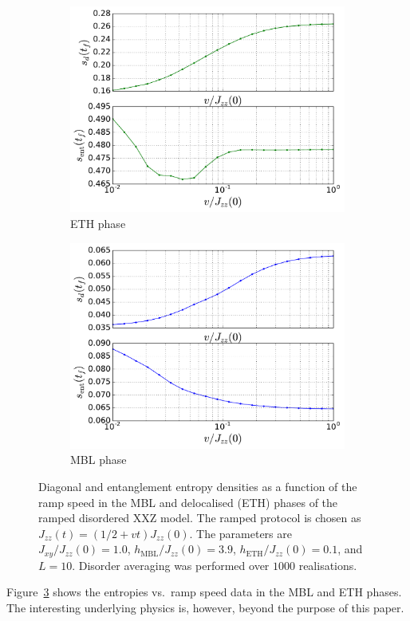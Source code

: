 \documentclass{SciPost}
\newcommand\0{\scalebox{-1}[1]{0}}
\begin{document}
\begin{figure}[t!]
	\centering
	\begin{subfigure}[b]{0.496\textwidth}
		\includegraphics[width=\textwidth]{example1_ETH}
		\caption{ETH phase}
		\label{fig:gull}
	\end{subfigure}
	\begin{subfigure}[b]{0.496\textwidth}
		\includegraphics[width=\textwidth]{example1_MBL}
		\caption{MBL phase}
		\label{fig:tiger}
	\end{subfigure}
	\caption{\label{fig:example1} Diagonal and entanglement entropy densities as a function of the ramp speed in the MBL and delocalised (ETH) phases of the ramped disordered XXZ model. The ramped protocol is chosen as $J_{zz}(t) = (1/2 + vt)J_{zz}(0)$. The parameters are $J_{xy}/J_{zz}(0)=1.0$, $h_\mathrm{MBL}/J_{zz}(0)=3.9$, $h_\mathrm{ETH}/J_{zz}(0)=0.1$, and $L=10$. Disorder averaging was performed over $1000$ realisations.}  
\end{figure}
Figure~\ref{fig:example1} shows the entropies vs.~ramp speed data in the MBL and ETH phases. The interesting underlying physics is, however, beyond the purpose of this paper.
\end{document}

